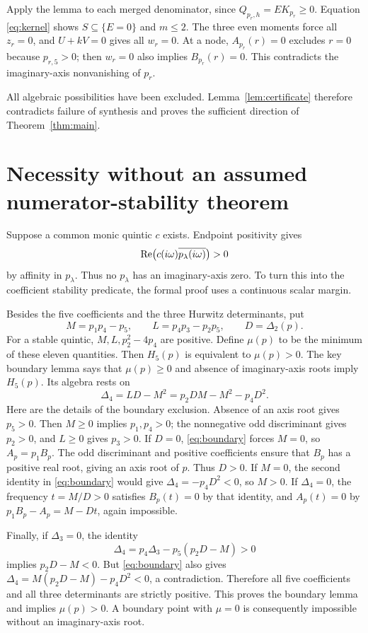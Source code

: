 \documentclass[11pt]{article}
\begin{document}
Apply the lemma to each merged denominator, since $Q_{p_r,h}=E K_{p_r}\ge0$. Equation \eqref{eq:kernel} shows $S\subseteq\{E=0\}$ and $m\le2$. The three even moments force all $z_r=0$, and $U+kV=0$ gives all $w_r=0$. At a node, $A_{p_r}(r)=0$ excludes $r=0$ because $p_{r,5}>0$; then $w_r=0$ also implies $B_{p_r}(r)=0$. This contradicts the imaginary-axis nonvanishing of $p_r$.

All algebraic possibilities have been excluded. Lemma~\ref{lem:certificate} therefore contradicts failure of synthesis and proves the sufficient direction of Theorem~\ref{thm:main}.

\section{Necessity without an assumed numerator-stability theorem}
Suppose a common monic quintic $c$ exists. Endpoint positivity gives
\[
 \operatorname{Re}\bigl(c(i\omega)\overline{p_\lambda(i\omega)}\bigr)>0
\]
by affinity in $p_\lambda$. Thus no $p_\lambda$ has an imaginary-axis zero. To turn this into the coefficient stability predicate, the formal proof uses a continuous scalar margin.

Besides the five coefficients and the three Hurwitz determinants, put
\[
 M=p_1p_4-p_5,\qquad L=p_4p_3-p_2p_5,\qquad D=\Delta_2(p).
\]
For a stable quintic, $M,L,p_2^2-4p_4$ are positive. Define $\mu(p)$ to be the minimum of these eleven quantities. Then $H_5(p)$ is equivalent to $\mu(p)>0$. The key boundary lemma says that $\mu(p)\ge0$ and absence of imaginary-axis roots imply $H_5(p)$. Its algebra rests on
\begin{equation}\label{eq:boundary}
 \Delta_4=LD-M^2=p_2DM-M^2-p_4D^2.
\end{equation}
Here are the details of the boundary exclusion. Absence of an axis root gives $p_5>0$. Then $M\ge0$ implies $p_1,p_4>0$; the nonnegative odd discriminant gives $p_2>0$, and $L\ge0$ gives $p_3>0$. If $D=0$, \eqref{eq:boundary} forces $M=0$, so $A_p=p_1B_p$. The odd discriminant and positive coefficients ensure that $B_p$ has a positive real root, giving an axis root of $p$. Thus $D>0$. If $M=0$, the second identity in \eqref{eq:boundary} would give $\Delta_4=-p_4D^2<0$, so $M>0$. If $\Delta_4=0$, the frequency $t=M/D>0$ satisfies $B_p(t)=0$ by that identity, and $A_p(t)=0$ by $p_1B_p-A_p=M-Dt$, again impossible.

Finally, if $\Delta_3=0$, the identity
\[
 \Delta_4=p_4\Delta_3-p_5(p_2D-M)>0
\]
implies $p_2D-M<0$. But \eqref{eq:boundary} also gives $\Delta_4=M(p_2D-M)-p_4D^2<0$, a contradiction. Therefore all five coefficients and all three determinants are strictly positive. This proves the boundary lemma and implies $\mu(p)>0$. A boundary point with $\mu=0$ is consequently impossible without an imaginary-axis root.
\end{document}

